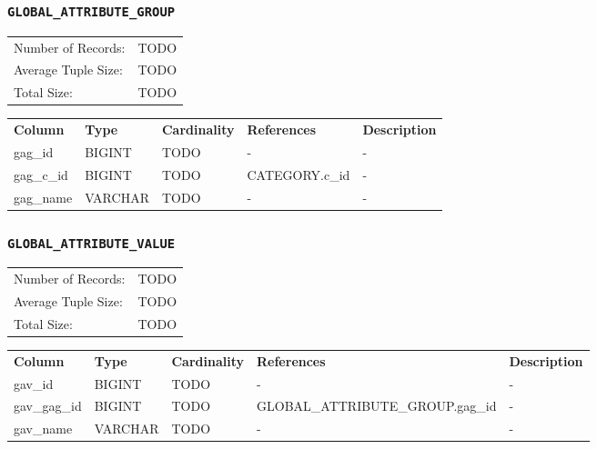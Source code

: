 \documentclass[a4paper,10pt]{article}
\begin{document}
\subsubsection{\texttt{GLOBAL\_ATTRIBUTE\_GROUP}}

\begin{tabular}{ll}
Number of Records:      & TODO \\
Average Tuple Size:     & TODO \\
Total Size:             & TODO \\
\end{tabular}

\vspace*{0.1in}

\noindent \begin{tabular*}{\textwidth}{@{\extracolsep{\fill}} lllll}
\textbf{Column} & \textbf{Type} & \textbf{Cardinality} & \textbf{References} & \textbf{Description} \\
gag\_id            & BIGINT     & TODO & -               & - \\
gag\_c\_id         & BIGINT     & TODO & CATEGORY.c\_id  & - \\
gag\_name          & VARCHAR    & TODO & -               & - \\
\end{tabular*}

\subsubsection{\texttt{GLOBAL\_ATTRIBUTE\_VALUE}}

\begin{tabular}{ll}
Number of Records:      & TODO \\
Average Tuple Size:     & TODO \\
Total Size:             & TODO \\
\end{tabular}

\vspace*{0.1in}

\noindent \begin{tabular*}{\textwidth}{@{\extracolsep{\fill}} lllll}
\textbf{Column} & \textbf{Type} & \textbf{Cardinality} & \textbf{References} & \textbf{Description} \\
gav\_id            & BIGINT     & TODO & -               & - \\
gav\_gag\_id       & BIGINT     & TODO & GLOBAL\_ATTRIBUTE\_GROUP.gag\_id & - \\
gav\_name          & VARCHAR    & TODO & -               & - \\
\end{tabular*}
\end{document}
